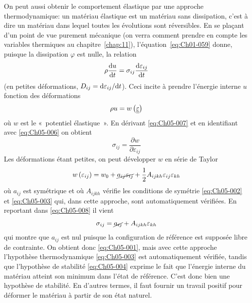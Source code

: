 On peut aussi obtenir le comportement élastique par une approche thermodynamique: un matériau élastique est un matériau sans dissipation, c'est à dire un matériau dans lequel toutes les évolutions sont réversibles.
En se plaçant d'un point de vue purement mécanique (on verra comment prendre en compte les variables thermiques au chapitre~\ref{chap:11}), l'équation~\eqref{eq:Ch01-059} donne, puisque la dissipation $\varphi$ est nulle, la relation
\begin{equation}
    \rho \frac{\mathrm{d} u}{\mathrm{d} t} = \sigma_{ij} \frac{\mathrm{d} \varepsilon_{ij}}{\mathrm{d} t}
    \label{eq:Ch05-006}
\end{equation}
(en petites déformations, $D_{ij} = \mathrm{d} \varepsilon_{ij} / \mathrm{d} t$).
Ceci incite à prendre l'énergie interne $u$ fonction des déformations
\begin{equation}
    \rho u = w \left( \underline{\underline{\varepsilon}} \right)
    \label{eq:Ch05-007}
\end{equation}
où $w$ est le «~potentiel élastique~».
En dérivant \eqref{eq:Ch05-007} et en identifiant avec \eqref{eq:Ch05-006} on obtient
\begin{equation}
    \sigma_{ij} = \frac{\partial w}{\partial \varepsilon_{ij}}
    \label{eq:Ch05-008}
\end{equation}
Les déformations étant petites, on peut développer $w$ en série de Taylor
\begin{equation}
    w \left( \varepsilon_{ij} \right) = w_0 + \cancel{a_{ij} \varepsilon_{ij}} + \frac{1}{2} A_{ijkh} \varepsilon_{ij}\varepsilon_{kh}
    \label{eq:Ch05-010}
\end{equation}
où $a_{ij}$ est symétrique et où $A_{ijkh}$ vérifie les conditions de symétrie \eqref{eq:Ch05-002} et \eqref{eq:Ch05-003} qui, dans cette approche, sont automatiquement vérifiées.
En reportant dans \eqref{eq:Ch05-008} il vient
\begin{displaymath}
    \sigma_{ij} = \cancel{a_{ij}} + A_{ijkh} \varepsilon_{kh}
\end{displaymath}
qui montre que $a_{ij}$ est nul puisque la configuration de référence est supposée libre de contrainte.
On obtient donc \eqref{eq:Ch05-001}, mais avec cette approche l'hypothèse thermodynamique \eqref{eq:Ch05-003} est automatiquement vérifiée, tandis que l'hypothèse de stabilité \eqref{eq:Ch05-004} exprime le fait que l'énergie interne du matériau atteint son minimum dans l'état de référence.
C'est donc bien une hypothèse de stabilité.
En d'autres termes, il faut fournir un travail positif pour déformer le matériau à partir de son état naturel.

